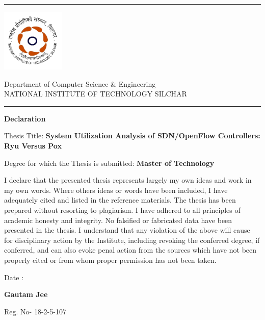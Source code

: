 \vspace*{0.5\fill}
\setlength{\headsep}{0.4in}
\noindent \rule{\linewidth}{1mm}
\begin{minipage}{0.2\textwidth}
\includegraphics[width=3cm,keepaspectratio]{images/NIT_Silchar_logo.png}
\end{minipage}
\begin{minipage}{\textwidth}
\large{Department of Computer Science \& Engineering}\\
\large{\MakeUppercase{NATIONAL INSTITUTE OF TECHNOLOGY SILCHAR}}
\end{minipage}

{\noindent\rule{\linewidth}{1mm}} \vspace{0.25in}

\begin{center}

{\bf \LARGE Declaration}

\end{center}

\par

Thesis Title: \textbf{System Utilization Analysis of SDN/OpenFlow Controllers: Ryu Versus Pox}

\vspace{0.25in}

Degree for which the Thesis is submitted: \textbf{Master of Technology}

\vspace{0.25in}

I declare that the presented thesis represents largely my own ideas and work in my own
words. Where others ideas or words have been included, I have adequately cited and listed
in the reference materials. The thesis has been prepared without resorting to plagiarism. I
have adhered to all principles of academic honesty and integrity. No falsified or fabricated
data have been presented in the thesis. I understand that any violation of the above will
cause for disciplinary action by the Institute, including revoking the conferred degree, if
conferred, and can also evoke penal action from the sources which have not been properly
cited or from whom proper permission has not been taken.


\vspace{0.5cm}
\begin{minipage}{0.5\textwidth}
\begin{flushleft}
Date :
\end{flushleft}
\end{minipage}
\begin{minipage}{0.4\textwidth}
\begin{flushright}

\vspace{0.5cm}

\vspace{0.25in}

\textbf{Gautam Jee}

Reg. No- 18-2-5-107
\end{flushright}
\vspace*{\fill}
\end{minipage}
\pagebreak

